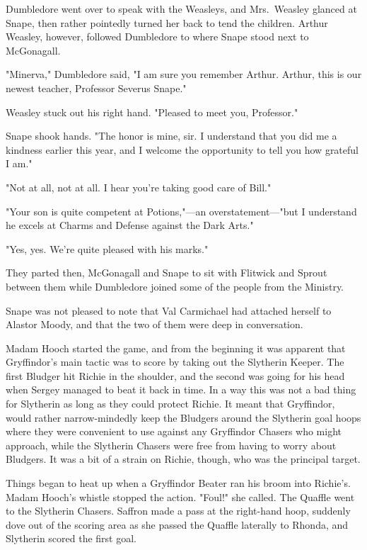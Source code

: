 Dumbledore went over to speak with the Weasleys, and Mrs.~Weasley glanced at Snape, then rather pointedly turned her back to tend the children. Arthur Weasley, however, followed Dumbledore to where Snape stood next to McGonagall.

"Minerva," Dumbledore said, "I am sure you remember Arthur. Arthur, this is our newest teacher, Professor Severus Snape."

Weasley stuck out his right hand. "Pleased to meet you, Professor."

Snape shook hands. "The honor is mine, sir. I understand that you did me a kindness earlier this year, and I welcome the opportunity to tell you how grateful I am."

"Not at all, not at all. I hear you're taking good care of Bill."

"Your son is quite competent at Potions,"—an overstatement—"but I understand he excels at Charms and Defense against the Dark Arts."

"Yes, yes. We're quite pleased with his marks."

They parted then, McGonagall and Snape to sit with Flitwick and Sprout between them while Dumbledore joined some of the people from the Ministry.

Snape was not pleased to note that Val Carmichael had attached herself to Alastor Moody, and that the two of them were deep in conversation.

Madam Hooch started the game, and from the beginning it was apparent that Gryffindor's main tactic was to score by taking out the Slytherin Keeper. The first Bludger hit Richie in the shoulder, and the second was going for his head when Sergey managed to beat it back in time. In a way this was not a bad thing for Slytherin as long as they could protect Richie. It meant that Gryffindor, would rather narrow-mindedly keep the Bludgers around the Slytherin goal hoops where they were convenient to use against any Gryffindor Chasers who might approach, while the Slytherin Chasers were free from having to worry about Bludgers. It was a bit of a strain on Richie, though, who was the principal target.

Things began to heat up when a Gryffindor Beater ran his broom into Richie's. Madam Hooch's whistle stopped the action. "Foul!" she called. The Quaffle went to the Slytherin Chasers. Saffron made a pass at the right-hand hoop, suddenly dove out of the scoring area as she passed the Quaffle laterally to Rhonda, and Slytherin scored the first goal.

